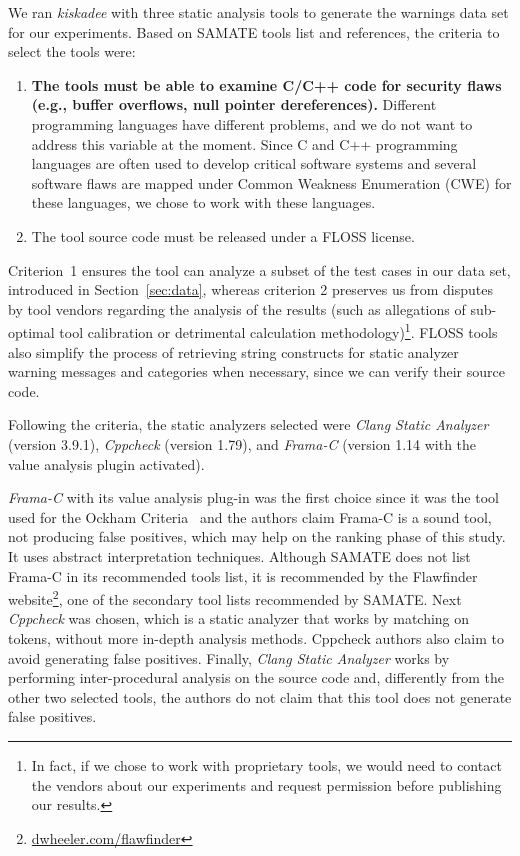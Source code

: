 We ran \textit{kiskadee} with three static analysis tools to generate the
warnings data set for our experiments. Based on SAMATE tools list and
references, the criteria to select the tools were:
\begin{enumerate}
  \item \textbf{The tools must be able to examine C/C++ code for security flaws (e.g., buffer overflows, null pointer dereferences).} Different programming languages have different problems, and we do not want to address this variable at the moment. Since C and C++ programming languages are often used to develop critical software systems and several software flaws are mapped under Common Weakness Enumeration (CWE) for these languages, we chose to work with these languages.
  \item The tool source code must be released under a FLOSS license.
\end{enumerate}
Criterion~1 ensures the tool can analyze a subset of the test cases in our data
set, introduced in Section~\ref{sec:data}, whereas criterion 2 preserves us
from disputes by tool vendors regarding the analysis of the results (such as
allegations of sub-optimal tool calibration or detrimental calculation
methodology)\footnote{In fact, if we chose
to work with
proprietary tools, we would need to contact the vendors about our experiments
and request permission before publishing our results.}. FLOSS tools also simplify the process of retrieving string
constructs for static analyzer warning messages and categories when necessary,
since we can verify their source code.

Following the criteria, the static
analyzers selected were \emph{Clang Static Analyzer} (version 3.9.1),
\emph{Cppcheck} (version 1.79), and \emph{Frama-C} (version 1.14 with the value
analysis plugin activated).

\textit{Frama-C} with its value analysis plug-in was the first choice since it
was the tool used for the Ockham Criteria~\citep{black_sate_2016} and the
authors claim Frama-C is a sound tool, not producing false positives, which may
help on the ranking phase of this study. It uses abstract interpretation
techniques. Although SAMATE does not list Frama-C in its recommended tools list, it
is recommended by the Flawfinder
website\footnote{\url{dwheeler.com/flawfinder}}, one of the secondary tool
lists recommended by SAMATE. Next \textit{Cppcheck} was chosen, which is a
static analyzer that works by matching on tokens, without more in-depth analysis
methods. Cppcheck authors also claim to avoid generating false positives.
Finally, \textit{Clang Static Analyzer} works by performing inter-procedural
analysis on the source code and, differently from the other two selected tools,
the authors do not claim that this tool does not generate false positives.

